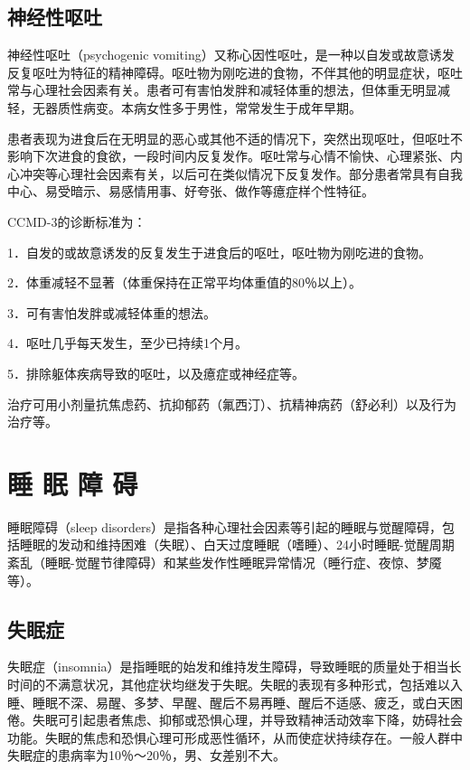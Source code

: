 \subsection{神经性呕吐}

神经性呕吐（psychogenic
vomiting）又称心因性呕吐，是一种以自发或故意诱发反复呕吐为特征的精神障碍。呕吐物为刚吃进的食物，不伴其他的明显症状，呕吐常与心理社会因素有关。患者可有害怕发胖和减轻体重的想法，但体重无明显减轻，无器质性病变。本病女性多于男性，常常发生于成年早期。

患者表现为进食后在无明显的恶心或其他不适的情况下，突然出现呕吐，但呕吐不影响下次进食的食欲，一段时间内反复发作。呕吐常与心情不愉快、心理紧张、内心冲突等心理社会因素有关，以后可在类似情况下反复发作。部分患者常具有自我中心、易受暗示、易感情用事、好夸张、做作等癔症样个性特征。

CCMD-3的诊断标准为：

1．自发的或故意诱发的反复发生于进食后的呕吐，呕吐物为刚吃进的食物。

2．体重减轻不显著（体重保持在正常平均体重值的80％以上）。

3．可有害怕发胖或减轻体重的想法。

4．呕吐几乎每天发生，至少已持续1个月。

5．排除躯体疾病导致的呕吐，以及癔症或神经症等。

治疗可用小剂量抗焦虑药、抗抑郁药（氟西汀）、抗精神病药（舒必利）以及行为治疗等。

\section{睡 眠 障 碍}

睡眠障碍（sleep
disorders）是指各种心理社会因素等引起的睡眠与觉醒障碍，包括睡眠的发动和维持困难（失眠）、白天过度睡眠（嗜睡）、24小时睡眠-觉醒周期紊乱（睡眠-觉醒节律障碍）和某些发作性睡眠异常情况（睡行症、夜惊、梦魇等）。

\subsection{失眠症}

失眠症（insomnia）是指睡眠的始发和维持发生障碍，导致睡眠的质量处于相当长时间的不满意状况，其他症状均继发于失眠。失眠的表现有多种形式，包括难以入睡、睡眠不深、易醒、多梦、早醒、醒后不易再睡、醒后不适感、疲乏，或白天困倦。失眠可引起患者焦虑、抑郁或恐惧心理，并导致精神活动效率下降，妨碍社会功能。失眠的焦虑和恐惧心理可形成恶性循环，从而使症状持续存在。一般人群中失眠症的患病率为10％～20％，男、女差别不大。


